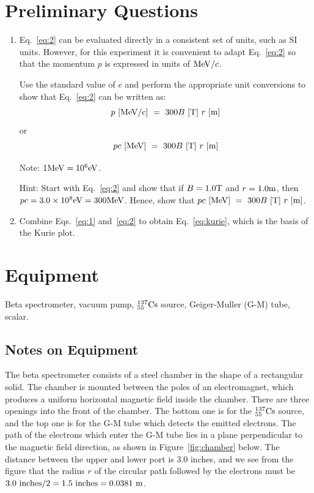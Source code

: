 \documentclass{article}
\newcommand{\cs}{${}^{137}_{55}{\rm Cs}$ }
\begin{document}
\section{Preliminary Questions}
\begin{enumerate}
\item Eq.~\ref{eq:2} can be evaluated directly in a consistent set of units,
such as SI units.  However, for this experiment it is convenient to
adapt Eq.~\ref{eq:2} so that the momentum $p$ is expressed in units of ${\rm MeV}/c$.

Use the standard value of $e$ and perform the appropriate unit conversions
to show that Eq.~\ref{eq:2} can be written as:
\begin{equation}
p~{\rm [MeV/c]} ~=~ 300 B~{\rm [T]}~r~{\rm [m]}
\end{equation}
or
\begin{equation}
pc~{\rm [MeV]} ~=~ 300 B~{\rm [T]}~r~{\rm [m]}
\end{equation}

Note: $1 {\rm MeV} = 10^6 {\rm eV}$.

Hint: Start with Eq.~\ref{eq:2} and show that if $B = 1.0 {\rm T}$ and $r = 1.0 {\rm m}$, then
$pc =  3.0 \times 10^8 {\rm eV} = 300 {\rm MeV}$.  Hence, show that
$pc~{\rm [MeV]} ~=~ 300 B~{\rm [T]}~r~{\rm [m]}$.

\item Combine Eqs.~\ref{eq:1} and~\ref{eq:2} to obtain Eq.~\ref{eq:kurie}, which is the basis of
the Kurie plot.

\end{enumerate}


\section{Equipment}
Beta spectrometer, vacuum pump, \cs source, Geiger-Muller
(G-M) tube, scalar.

\subsection{Notes on Equipment}

The beta spectrometer consists of a steel chamber in the shape of a
rectangular solid.  The chamber is mounted between the poles of an
electromagnet, which produces a uniform horizontal magnetic field
inside the chamber.  There are three openings into the front of the
chamber. The bottom one is for the \cs source, and the top one is
for the G-M tube which detects the emitted electrons.  The path of the
electrons which enter the G-M tube lies in a plane perpendicular to the
magnetic field direction, as shown in Figure~\ref{fig:chamber} below.  The distance
between the upper and lower port is 3.0 inches, and we see from the
figure that the radius $r$ of the circular path followed by the electrons
must be $3.0~{\rm inches}/2 = 1.5~{\rm inches} =  0.0381~{\rm m}$.
\end{document}
